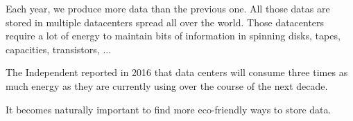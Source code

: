 
Each year, we produce more data than the previous one. All those datas are stored in multiple datacenters spread all over the world. Those datacenters require a lot of energy to maintain bits of information in spinning disks, tapes, capacities, transistors, ...

The Independent reported in 2016 that data centers will consume three times as much energy as they are currently using over the course of the next decade. \cite{bib:data_storage_impact}

It becomes naturally important to find more eco-friendly ways to store data.

